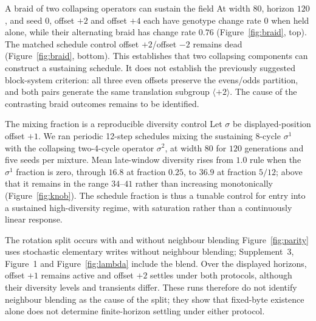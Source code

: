 \begin{empiricalfinding}[label={find:braid}]{A braid of two collapsing operators can sustain the field}
At width $80$, horizon $120$, and seed $0$, offset $+2$ and offset $+4$ each
have genotype change rate $0$ when held alone, while their alternating braid
has change rate $0.76$ (Figure~\ref{fig:braid}, top). The matched schedule
control offset $+2$/offset $-2$ remains dead (Figure~\ref{fig:braid}, bottom).
This establishes that two collapsing components can construct a sustaining
schedule. It does not establish the previously suggested block-system
criterion: all three even offsets preserve the evens/odds partition, and both
pairs generate the same translation subgroup $\langle {+2}\rangle$. The cause
of the contrasting braid outcomes remains to be identified.
\end{empiricalfinding}

\begin{empiricalfinding}[label={find:knob}]{The mixing fraction is a reproducible diversity control}
Let $\sigma$ be displayed-position offset $+1$. We ran periodic 12-step
schedules mixing the sustaining 8-cycle $\sigma^1$ with the collapsing
two-4-cycle operator $\sigma^2$, at width $80$ for $120$ generations and five
seeds per mixture. Mean late-window diversity rises from $1.0$ rule when the
$\sigma^1$ fraction is zero, through $16.8$ at fraction $0.25$, to $36.9$ at
fraction $5/12$; above that it remains in the range $34$--$41$ rather than
increasing monotonically (Figure~\ref{fig:knob}). The schedule fraction is thus
a tunable control for entry into a sustained high-diversity regime, with
saturation rather than a continuously linear response.
\end{empiricalfinding}

\begin{empiricalfinding}[label={obs:couplings}]{The rotation split occurs with and without neighbour blending}
Figure~\ref{fig:parity} uses stochastic elementary writes without neighbour
blending; Supplement~3, Figure~1 and Figure~\ref{fig:lambda} include the blend. Over the
displayed horizons, offset $+1$ remains active and offset $+2$ settles under
both protocols, although their diversity levels and transients differ. These
runs therefore do not identify neighbour blending as the cause of the split;
they show that fixed-byte existence alone does not determine finite-horizon
settling under either protocol.
\end{empiricalfinding}

